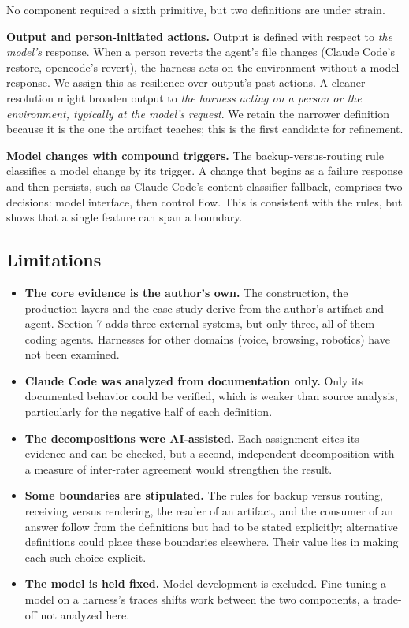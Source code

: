 No component required a sixth primitive, but two definitions are under strain.

\textbf{Output and person-initiated actions.} Output is defined with respect to \emph{the model's} response. When a person reverts the agent's file changes (Claude Code's restore, opencode's revert), the harness acts on the environment without a model response. We assign this as resilience over output's past actions. A cleaner resolution might broaden output to \emph{the harness acting on a person or the environment, typically at the model's request}. We retain the narrower definition because it is the one the artifact teaches; this is the first candidate for refinement.

\textbf{Model changes with compound triggers.} The backup-versus-routing rule classifies a model change by its trigger. A change that begins as a failure response and then persists, such as Claude Code's content-classifier fallback, comprises two decisions: model interface, then control flow. This is consistent with the rules, but shows that a single feature can span a boundary.

\subsection{Limitations}

\begin{itemize}
\tightlist
\item
  \textbf{The core evidence is the author's own.} The construction, the production layers and the case study derive from the author's artifact and agent. Section 7 adds three external systems, but only three, all of them coding agents. Harnesses for other domains (voice, browsing, robotics) have not been examined.
\item
  \textbf{Claude Code was analyzed from documentation only.} Only its documented behavior could be verified, which is weaker than source analysis, particularly for the negative half of each definition.
\item
  \textbf{The decompositions were AI-assisted.} Each assignment cites its evidence and can be checked, but a second, independent decomposition with a measure of inter-rater agreement would strengthen the result.
\item
  \textbf{Some boundaries are stipulated.} The rules for backup versus routing, receiving versus rendering, the reader of an artifact, and the consumer of an answer follow from the definitions but had to be stated explicitly; alternative definitions could place these boundaries elsewhere. Their value lies in making each such choice explicit.
\item
  \textbf{The model is held fixed.} Model development is excluded. Fine-tuning a model on a harness's traces shifts work between the two components, a trade-off not analyzed here.
\end{itemize}


